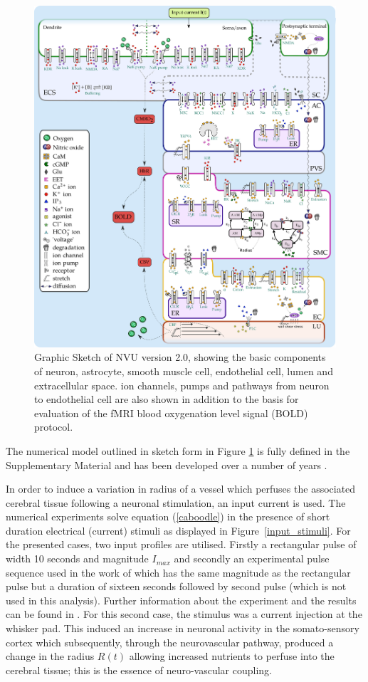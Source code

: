 \begin{figure}[h!]
\centering
\includegraphics[width=0.7\linewidth]{Figures/nvu_20}
\caption[Graphic Sketch of NVU version 2.0]{Graphic Sketch of NVU version 2.0, showing the basic components of neuron, astrocyte, smooth muscle cell, endothelial cell, lumen and extracellular space. ion channels, pumps and pathways from neuron to endothelial cell are also shown in addition to the basis for evaluation of the fMRI blood oxygenation level signal (BOLD) protocol.}
\label{fig:nvu20}
\end{figure}

  
  
The numerical model outlined in sketch form in Figure \ref{fig:nvu20} is fully defined in the Supplementary Material  and has been developed over a number of years \cite{Farr2011,Dormanns2015,Dormanns2016b}. 

In order to induce a variation in radius of a vessel which perfuses the associated cerebral tissue following a neuronal stimulation, an input current is used. The numerical experiments solve equation (\ref{caboodle}) in the presence of short duration electrical (current) stimuli as displayed in Figure~\ref{input_stimuli}. For the presented cases, two input profiles are utilised. Firstly a rectangular pulse of width 10 seconds and magnitude  $I_{max}$ and secondly an experimental pulse sequence used in the work of \cite{Zheng2010} which has the same magnitude as the rectangular pulse but a duration of sixteen seconds followed by second pulse (which is not used in this analysis). Further information about the experiment and the results can be found in \cite{Zheng2010}.  For this second case, the stimulus was a current injection at the whisker pad. This induced an increase in neuronal activity in the somato-sensory cortex which subsequently, through the neurovascular pathway, produced a  change in the radius $R(t)$ allowing increased nutrients to perfuse into the cerebral tissue; this is  the essence of neuro-vascular coupling. 


